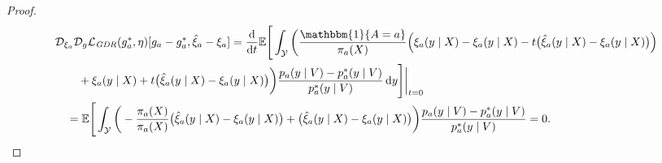 \documentclass[dvipsnames]{article} %
\newcommand*\diff{\mathop{}\!\mathrm{d}}
\begin{document}
\begin{proof}
    \begingroup\makeatletter{}\check@mathfonts
    \begin{align}
        & \mathcal{D}_{\xi_a} \mathcal{D}_g\mathcal{L}_\text{\emph{GDR}}(g_a^*, \eta)[g_a - g_a^*, \hat{\xi}_a - \xi_a]=  \frac{\diff}{\diff t} \mathbb{E}\Bigg[ \int_{\mathcal{Y}} \bigg(\frac{\mathbbm{1}\{A = a\}}{\pi_a(X)} \Big(\xi_a(y \mid X) - {\xi}_a(y \mid X) - t \big( \hat{\xi}_a(y \mid X) - {\xi}_a(y \mid X) \big) \Big) \\
        & \quad \quad + {\xi}_a(y \mid X) + t \big( \hat{\xi}_a(y \mid X) - {\xi}_a(y \mid X) \big) \bigg) \frac{p_a(y \mid V) - p_a^*(y \mid V)}{p_a^*(y \mid V)} \diff y\Bigg]\bigg|_{t=0} \nonumber \\
        & \quad = \mathbb{E}\Bigg[ \int_{\mathcal{Y}} \bigg(- \frac{\pi_a(X)}{\pi_a(X)} \big( \hat{\xi}_a(y \mid X) - {\xi}_a(y \mid X) \big) + \big( \hat{\xi}_a(y \mid X) - {\xi}_a(y \mid X) \big) \bigg)  \frac{p_a(y \mid V) - p_a^*(y \mid V)}{p_a^*(y \mid V)} = 0.
    \end{align}
    \endgroup


\end{proof}
\end{document}
